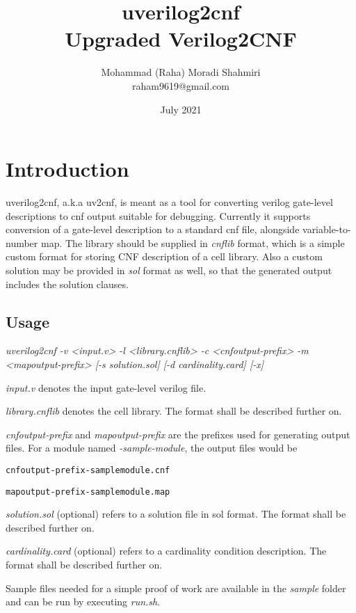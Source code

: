 \documentclass{article}
\title{uverilog2cnf\\Upgraded Verilog2CNF}
\date{July 2021}
\author{Mohammad (Raha) Moradi Shahmiri\\raham9619@gmail.com}
\begin{document}
	\maketitle
	\newpage


	\section{Introduction}
	uverilog2cnf, a.k.a uv2cnf, is meant as a tool for converting verilog gate-level descriptions to 
    cnf output suitable for debugging. Currently it supports conversion of a gate-level description to a standard 
    cnf file, alongside variable-to-number map. The library should be supplied in \textit{cnflib} format, which is a simple 
    custom format for storing CNF description of a cell library. Also a custom solution may be provided in \textit{sol} format 
    as well, so that the generated output includes the solution clauses. 

    \subsection {Usage}
    \textit{uverilog2cnf -v <input.v> -l <library.cnflib> -c <cnfoutput-prefix> -m <mapoutput-prefix> [-s solution.sol] [-d cardinality.card] [-x]}

    \textit{input.v} denotes the input gate-level verilog file.

    \textit{library.cnflib} denotes the cell library. The format shall be described further on.

    \textit{cnfoutput-prefix}  and \textit{mapoutput-prefix} are the prefixes used for generating output files. 
    For a module named \textit{-sample-module}, the output files would be 

    \lstinline{cnfoutput-prefix-samplemodule.cnf}

    \lstinline{mapoutput-prefix-samplemodule.map}

    \textit{solution.sol} (optional) refers to a solution file in sol format. The format shall be described further on.

    \textit{cardinality.card} (optional) refers to a cardinality condition description. The format shall be described further on.

    Sample files needed for a simple proof of work are available in the \textit{sample} folder and can be run by executing 
    \textit{run.sh}.
\end{document}
